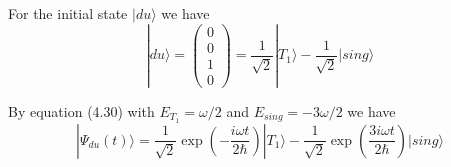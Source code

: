 \documentclass[12pt]{article}
\begin{document}
For the initial state $|du\rangle$ we have
\begin{equation*}
|du\rangle=\begin{pmatrix}0\\0\\1\\0\end{pmatrix}
=\frac{1}{\sqrt2}|T_1\rangle-\frac{1}{\sqrt2}|sing\rangle
\end{equation*}

By equation (4.30) with $E_{T_1}=\omega/2$ and $E_{sing}=-3\omega/2$ we have
\begin{equation*}
|\Psi_{du}(t)\rangle
=\frac{1}{\sqrt2}\exp\left(-\frac{i\omega t}{2\hbar}\right)|T_1\rangle
-\frac{1}{\sqrt2}\exp\left(\frac{3i\omega t}{2\hbar}\right)|sing\rangle
\end{equation*}
\end{document}
